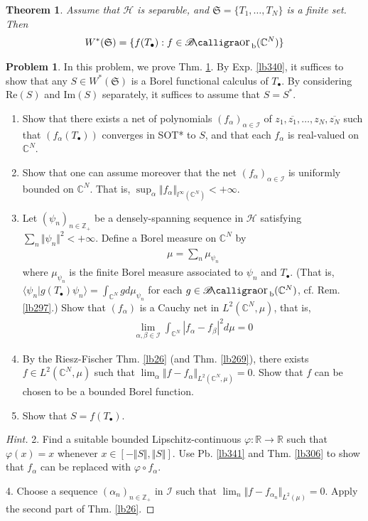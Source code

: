 \documentclass[12pt,b5paper,notitlepage]{article}
\theoremstyle{definition}
\newtheorem{prob}{\color{red}Problem}[section]
\theoremstyle{plain}
\newtheorem{thm}[df]{Theorem}
\DeclareMathOperator{\Borb}{{\mathscr{B}\text{\kern -2pt {\calligra\large or}}\,}_{\mathrm b}}
\newcommand{\fk}{\mathfrak}
\newcommand{\ovl}{\overline}
\newcommand{\bk}[1]{\langle {#1}\rangle}
\newcommand{\blt}{\bullet}
\newcommand{\Cbb}{\mathbb C}
\newcommand{\Zbb}{\mathbb Z}
\newcommand{\Rbb}{\mathbb R}
\newcommand{\Real}{\mathrm{Re}}
\newcommand{\Imag}{\mathrm{Im}}
\newcommand{\MH}{\mathcal H}
\newcommand{\SI}{\mathscr I}
\numberwithin{equation}{section}
\begin{document}
\begin{thm}\label{lb339}
Assume that $\MH$ is separable, and $\fk S=\{T_1,\dots,T_N\}$ is a finite set. Then
\begin{align*}
W^*(\fk S)=\{f(T_\blt):f\in\Borb(\Cbb^N)\}
\end{align*}
\end{thm}


\begin{prob}\label{lb344}
In this problem, we prove Thm. \ref{lb339}. By Exp. \ref{lb340}, it suffices to show that any $S\in W^*(\fk S)$ is a Borel functional calculus of $T_\blt$. By considering $\Real(S)$ and $\Imag(S)$ separately, it suffices to assume that $S=S^*$.
\begin{enumerate}
\item Show that there exists a net of polynomials $(f_\alpha)_{\alpha\in\SI}$ of $z_1,\ovl{z_1},\dots,z_N,\ovl{z_N}$ such that $(f_\alpha(T_\blt))$ converges in SOT* to $S$, and that each $f_\alpha$ is real-valued on $\Cbb^N$.
\item Show that one can assume moreover that the net $(f_\alpha)_{\alpha\in\SI}$ is uniformly bounded on $\Cbb^N$. That is, $\sup_\alpha \Vert f_\alpha\Vert_{l^\infty(\Cbb^N)}<+\infty$.
\item Let $(\psi_n)_{n\in\Zbb_+}$ be a densely-spanning sequence in $\MH$ satisfying $\sum_n\Vert\psi_n\Vert^2<+\infty$. Define a Borel measure on $\Cbb^N$ by
\begin{align*}
\mu=\sum_n \mu_{\psi_n}
\end{align*}
where $\mu_{\psi_n}$ is the finite Borel measure associated to $\psi_n$ and $T_\blt$. (That is, $\bk{\psi_n|g(T_\blt)\psi_n}=\int_{\Cbb^N}gd\mu_{\psi_n}$ for each $g\in\Borb(\Cbb^N)$, cf. Rem. \ref{lb297}.) Show that $(f_\alpha)$ is a Cauchy net in $L^2(\Cbb^N,\mu)$, that is,
\begin{align*}
\lim_{\alpha,\beta\in\SI}\int_{\Cbb^N} |f_\alpha-f_\beta|^2d\mu=0
\end{align*}
\item By the Riesz-Fischer Thm. \ref{lb26} (and Thm. \ref{lb269}), there exists $f\in L^2(\Cbb^N,\mu)$ such that $\lim_\alpha\Vert f-f_\alpha\Vert_{L^2(\Cbb^N,\mu)}=0$. Show that $f$ can be chosen to be a bounded Borel function.
\item Show that $S=f(T_\blt)$.
\end{enumerate}
\end{prob}


\begin{proof}[Hint]
2. Find a suitable bounded Lipschitz-continuous $\varphi:\Rbb\rightarrow\Rbb$ such that $\varphi(x)=x$ whenever $x\in [-\Vert S\Vert,\Vert S\Vert]$. Use Pb. \ref{lb341} and Thm. \ref{lb306} to show that $f_\alpha$ can be replaced with $\varphi\circ f_\alpha$.

4. Choose a sequence $(\alpha_n)_{n\in\Zbb_+}$ in $\SI$ such that $\lim_n \Vert f-f_{\alpha_n}\Vert_{L^2(\mu)}=0$. Apply the second part of Thm. \ref{lb26}.
\end{proof}
\end{document}
